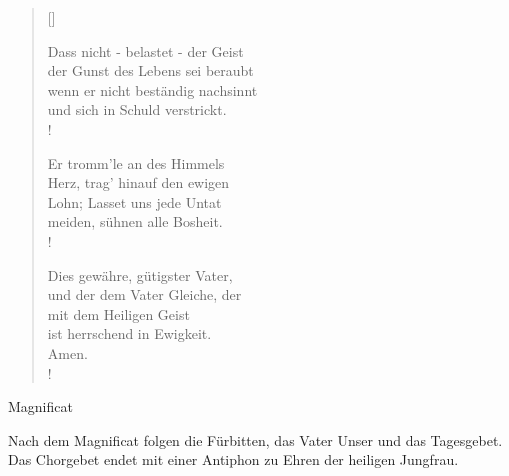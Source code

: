 {\begin{multicols}{2}
\begin{verse}[\versewidth]
{\small\rm{ Dass nicht - belastet - der Geist \\
der Gunst des Lebens sei beraubt\\
wenn er nicht beständig nachsinnt\\
und sich in Schuld verstrickt.\\!

 Er tromm'le an des Himmels\\
Herz, trag' hinauf den ewigen\\
Lohn; Lasset uns jede Untat\\
meiden, sühnen alle Bosheit.\\!

 Dies gewähre, gütigster Vater,\\
und der dem Vater Gleiche, der \\
mit dem Heiligen Geist \\
ist herrschend in Ewigkeit.\\
Amen.\\!}}
\end{verse}
\end{multicols}
}


\vspace{0.3cm}

\begin{flushleft}


\medskip
{\rm{
}}
\end{flushleft}

\medskip



\def\greinitialformat#1{{\fontsize{40}{40}\selectfont #1}}
\gresetfirstlineaboveinitial{\footnotesize \textcolor{red}{Magni}}{}
\setaboveinitialseparation{0.72mm}

\vspace{0.3cm}

 Magnificat 

\vspace{0.5cm}


Nach dem Magnificat folgen die Fürbitten, das Vater Unser und das Tagesgebet.
Das Chorgebet endet mit einer Antiphon zu Ehren der heiligen Jungfrau.

\newpage